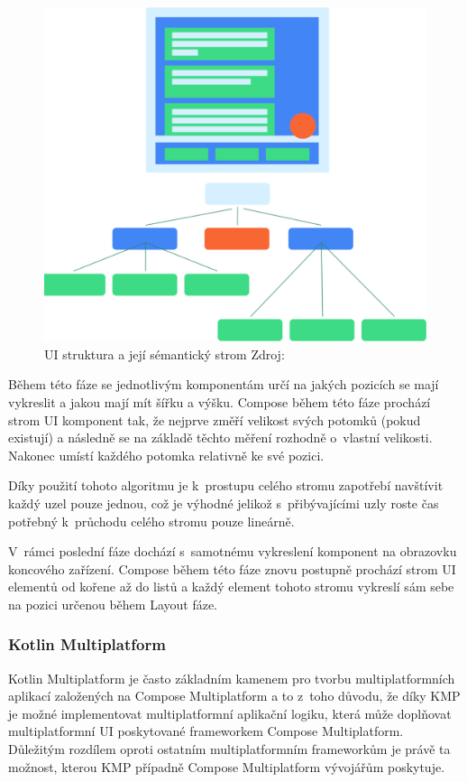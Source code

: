 \begin{figure}[H]
  \centering
  \includegraphics[width=.5\textwidth]{semantics-ui-tree.png}
  \caption{UI struktura a její sémantický strom Zdroj: \cite{imgSemantics}}
  \label{fig:semantics-ui-tree}
\end{figure}

Během této fáze se jednotlivým komponentám určí na jakých pozicích se mají vykreslit a jakou mají mít šířku a výšku.
Compose během této fáze prochází strom UI komponent tak, že nejprve změří velikost svých potomků (pokud existují) a následně se 
na základě těchto měření rozhodně o~vlastní velikosti. Nakonec umístí každého potomka relativně ke své pozici.\cite{jetpackPhases}

Díky použití tohoto algoritmu je k~prostupu celého stromu zapotřebí navštívit každý uzel pouze jednou, což je výhodné jelikož
s~přibývajícími uzly roste čas potřebný k~průchodu celého stromu pouze lineárně. \cite{jetpackPhases}

V~rámci poslední fáze dochází s~samotnému vykreslení komponent na obrazovku koncového zařízení. \cite{jetpackPhases}
Compose během této fáze znovu postupně prochází strom UI elementů od kořene až do listů a každý element tohoto stromu vykreslí sám sebe 
na pozici určenou během Layout fáze. \cite{jetpackPhases}

\subsubsection{Kotlin Multiplatform} \label{kmpSection}



Kotlin Multiplatform je často základním kamenem pro tvorbu multiplatformních aplikací založených na Compose Multiplatform a to
z~toho důvodu, že díky KMP je možné implementovat multiplatformní aplikační logiku, která může doplňovat multiplatformní UI 
poskytované frameworkem Compose Multiplatform. \cite{KMPUseCases} Důležitým rozdílem oproti ostatním multiplatformním frameworkům 
je právě ta možnost, kterou KMP případně Compose Multiplatform vývojářům poskytuje. 

